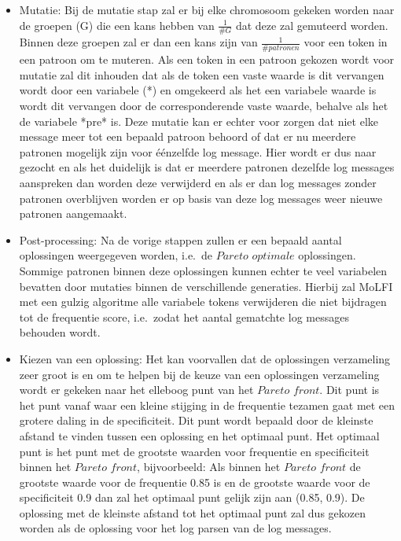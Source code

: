 \begin{itemize}
    \item Mutatie: Bij de mutatie stap zal er bij elke chromosoom gekeken worden naar de groepen (G) die een kans hebben van $\frac{1}{\#G}$ dat deze zal gemuteerd worden. Binnen deze groepen zal er dan een kans zijn van $\frac{1}{\#patronen}$ voor een token in een patroon om te muteren. Als een token in een patroon gekozen wordt voor mutatie zal dit inhouden dat als de token een vaste waarde is dit vervangen wordt door een variabele (*) en omgekeerd als het een variabele waarde is wordt dit vervangen door de corresponderende vaste waarde, behalve als het de variabele *pre* is. Deze mutatie kan er echter voor zorgen dat niet elke message meer tot een bepaald patroon behoord of dat er nu meerdere patronen mogelijk zijn voor éénzelfde log message. Hier wordt er dus naar gezocht en als het duidelijk is dat er meerdere patronen dezelfde log messages aanspreken dan worden deze verwijderd en als er dan log messages zonder patronen overblijven worden er op basis van deze log messages weer nieuwe patronen aangemaakt.\\
    \item Post-processing: Na de vorige stappen zullen er een bepaald aantal oplossingen weergegeven worden, i.e.\ de $Pareto$ $optimale$ oplossingen. Sommige patronen binnen deze oplossingen kunnen echter te veel variabelen bevatten door mutaties binnen de verschillende generaties. Hierbij zal MoLFI met een gulzig algoritme alle variabele tokens verwijderen die niet bijdragen tot de frequentie score, i.e.\ zodat het aantal gematchte log messages behouden wordt.\\
    \item Kiezen van een oplossing: Het kan voorvallen dat de oplossingen verzameling zeer groot is en om te helpen bij de keuze van een oplossingen verzameling wordt er gekeken naar het elleboog punt van het $Pareto$ $front$. Dit punt is het punt vanaf waar een kleine stijging in de frequentie tezamen gaat met een grotere daling in de specificiteit. Dit punt wordt bepaald door de kleinste afstand te vinden tussen een oplossing en het optimaal punt. Het optimaal punt is het punt met de grootste waarden voor frequentie en specificiteit binnen het $Pareto$ $front$, bijvoorbeeld: Als binnen het $Pareto$ $front$ de grootste waarde voor de frequentie 0.85 is en de grootste waarde voor de specificiteit 0.9 dan zal het optimaal punt gelijk zijn aan (0.85, 0.9). De oplossing met de kleinste afstand tot het optimaal punt zal dus gekozen worden als de oplossing voor het log parsen van de log messages.
\end{itemize}

